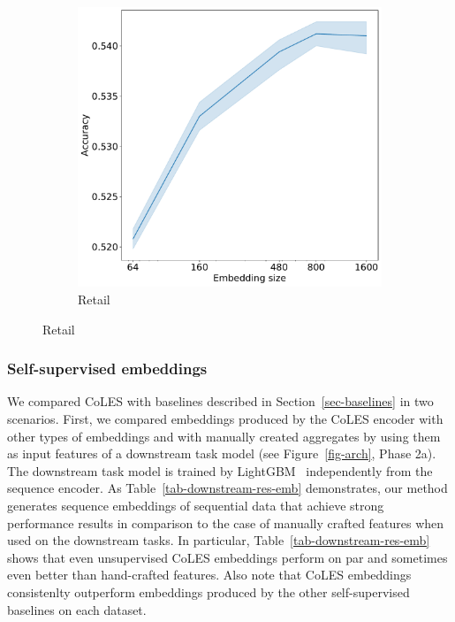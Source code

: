 \documentclass[sigconf, anonymous]{acmart}
\begin{document}
\begin{figure}
  \begin{subfigure}{0.25\linewidth}
    \caption{Retail}
    \includegraphics[width=\linewidth]{figures/hidden_size_x5.pdf}
  \end{subfigure}
  \label{fig-emb-dim}
\end{figure}

\subsubsection{Self-supervised embeddings}

We compared CoLES with baselines described in Section~\ref{sec-baselines} in two scenarios. First, we compared embeddings produced by the CoLES encoder with other types of embeddings and with manually created aggregates by using them as input features of a downstream task model (see Figure~\ref{fig-arch}, Phase 2a). The downstream task model is trained by LightGBM~\citep{Ke2017LightGBMAH} independently from the sequence encoder. As Table~\ref{tab-downstream-res-emb} demonstrates, our method generates sequence embeddings of sequential data that achieve strong performance results in comparison to the case of manually crafted features when used on the downstream tasks.
In particular, Table~\ref{tab-downstream-res-emb} shows that even unsupervised CoLES embeddings perform on par and sometimes even better than hand-crafted features. Also note that CoLES embeddings consistenlty outperform embeddings produced by the other self-supervised baselines on each dataset.
\end{document}
